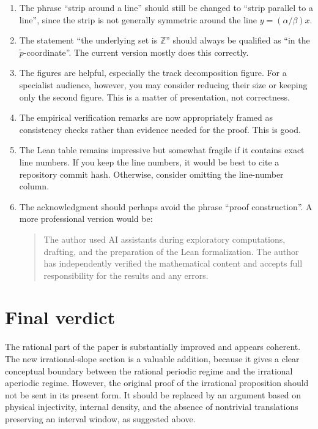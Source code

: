 \documentclass[11pt]{article}
\begin{document}
\begin{enumerate}[label=\arabic*.]
    \item The phrase ``strip around a line'' should still be changed to
    ``strip parallel to a line'', since the strip is not generally symmetric
    around the line \(y=(\alpha/\beta)x\).

    \item The statement ``the underlying set is \(\mathbb Z\)'' should always
    be qualified as ``in the \(\tilde p\)-coordinate''.  The current version
    mostly does this correctly.

    \item The figures are helpful, especially the track decomposition figure.
    For a specialist audience, however, you may consider reducing their size
    or keeping only the second figure.  This is a matter of presentation, not
    correctness.

    \item The empirical verification remarks are now appropriately framed as
    consistency checks rather than evidence needed for the proof.  This is
    good.

    \item The Lean table remains impressive but somewhat fragile if it contains
    exact line numbers.  If you keep the line numbers, it would be best to cite
    a repository commit hash.  Otherwise, consider omitting the line-number
    column.

    \item The acknowledgment should perhaps avoid the phrase ``proof
    construction''.  A more professional version would be:
    \begin{quote}
    The author used AI assistants during exploratory computations, drafting,
    and the preparation of the Lean formalization.  The author has
    independently verified the mathematical content and accepts full
    responsibility for the results and any errors.
    \end{quote}
\end{enumerate}

\section*{Final verdict}

The rational part of the paper is substantially improved and appears coherent.
The new irrational-slope section is a valuable addition, because it gives a
clear conceptual boundary between the rational periodic regime and the
irrational aperiodic regime.  However, the original proof of the irrational
proposition should not be sent in its present form.  It should be replaced by
an argument based on physical injectivity, internal density, and the absence of
nontrivial translations preserving an interval window, as suggested above.
\end{document}
